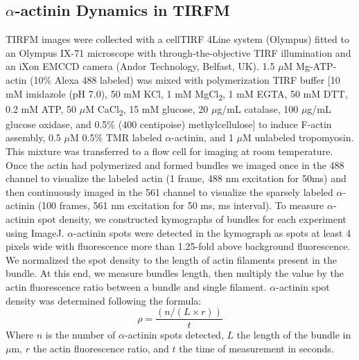 \subsection{\texorpdfstring{$\alpha$}{a}-actinin Dynamics in TIRFM}
TIRFM images were collected with a cellTIRF 4Line system (Olympus) fitted to an Olympus IX-71 microscope with through-the-objective TIRF illumination and an iXon EMCCD camera (Andor Technology, Belfast, UK). 1.5 $\mu$M Mg-ATP-actin (10\% Alexa 488 labeled) was mixed with polymerization TIRF buffer [10 mM imidazole (pH 7.0), 50 mM KCl, 1 mM MgCl\textsubscript{2}, 1 mM EGTA, 50 mM DTT, 0.2 mM ATP, 50 $\mu$M CaCl\textsubscript{2}, 15 mM glucose, 20 $\mu$g/mL catalase, 100 $\mu$g/mL glucose oxidase, and 0.5\% (400 centipoise) methylcellulose] to induce F-actin assembly, 0.5 $\mu$M 0.5\% TMR labeled $\alpha$-actinin, and 1 $\mu$M unlabeled tropomyosin. This mixture was transferred to a flow cell for imaging at room temperature. Once the actin had polymerized and formed bundles we imaged once in the 488 channel to visualize the labeled actin (1 frame, 488 nm excitation for 50ms) and then continuously imaged in the 561 channel to visualize the sparsely labeled $\alpha$-actinin (100 frames, 561 nm excitation for 50 ms,  ms interval).
To measure $\alpha$-actinin spot density, we constructed kymographs of bundles for each experiment using ImageJ. $\alpha$-actinin spots were detected in the kymograph as spots at least 4 pixels wide with fluorescence more than 1.25-fold above background fluorescence. We normalized the spot density to the length of actin filaments present in the bundle. At this end, we measure bundles length, then multiply the value by the actin fluorescence ratio between a bundle and single filament. $\alpha$-actinin spot density was determined following the formula: 
\[\rho = \frac{(n/(L\times r))}{t}\]
Where $n$ is the number of $\alpha$-actinin spots detected, $L$ the length of the bundle in $\mu$m, $r$ the actin fluorescence ratio, and $t$ the time of measurement in seconds.


